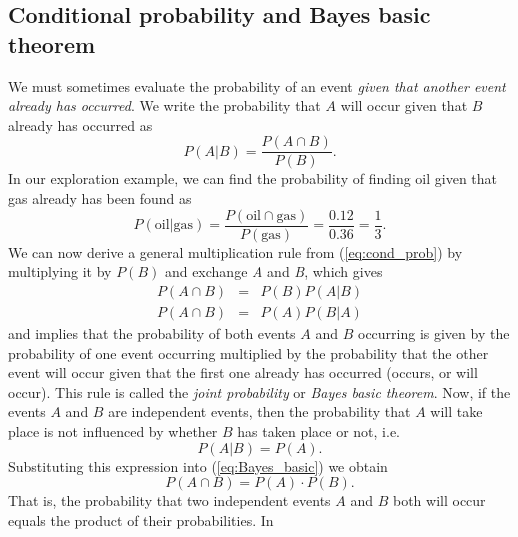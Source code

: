 \subsection{Conditional probability and Bayes basic theorem}

	We must sometimes evaluate the probability of an event \emph{given that another event already has occurred}.
We write the probability that $A$ will occur given that $B$ already has occurred as
\begin{equation}
	P(A | B) = \frac{P(A \cap B)}{P(B)}.
	\label{eq:cond_prob}
\end{equation}
In our exploration example, we can find the probability of finding oil given that gas already has 
been found as
\begin{equation}
	P(\mbox{oil}|\mbox{gas}) = \frac{P(\mbox{oil} \cap \mbox{gas})}{P(\mbox{gas})} = \frac{0.12}{0.36} = \frac{1}{3}.
\end{equation}	 
We can now derive a general multiplication rule from (\ref{eq:cond_prob}) by multiplying it by $P(B)$ and
exchange \emph{A} and \emph{B}, which gives
\begin{equation}
\begin{array}{rcl}
P(A \cap B) & = & P(B) P (A | B)\\
P(A \cap B) & = & P(A) P (B | A)
\end{array}
\label{eq:Bayes_basic}
\end{equation}
and implies that the probability of both events $A$ and $B$ occurring is given by the probability of 
one event occurring multiplied by the probability that the other event will occur given that the first one 
already has occurred (occurs, or will occur).  This rule is called the \emph{joint probability} or \emph{Bayes 
basic theorem}.
	Now, if the events $A$ and $B$ are independent events, then the probability that $A$ will take place 
is not influenced by whether $B$ has taken place or not, i.e.
\begin{equation}
	P(A|B) = P(A).
\end{equation}
Substituting this expression into (\ref{eq:Bayes_basic}) we obtain
\begin{equation}
P(A\cap B) = P(A) \cdot P(B).
\label{eq:jointindependent}
\end{equation}	 
That is, the probability that two independent events $A$ and $B$ both will occur equals the product of their probabilities.  In 
